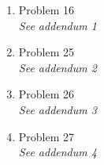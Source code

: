 \begin{enumerate}[leftmargin=2cm,labelsep=.5cm,label=\bf\arabic*.]

\item Problem 16 \\
\emph{See addendum 1}

\item Problem 25 \\
\emph{See addendum 2}

\item Problem 26 \\
\emph{See addendum 3}

\item Problem 27 \\
\emph{See addendum 4}

\end{enumerate}
